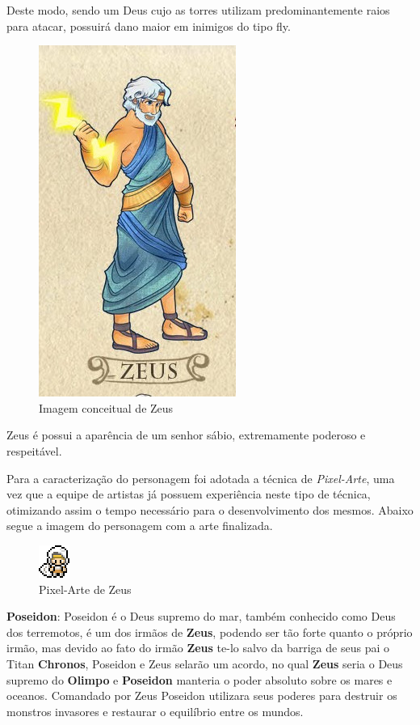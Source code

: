 \documentclass[11pt]{article} %
\begin{document}
Deste modo, sendo um Deus cujo as torres utilizam predominantemente raios para atacar, possuirá dano maior em inimigos do tipo fly.
\begin{figure}[!htp]
\centering
\includegraphics[scale=0.25]{res/characters/zeus.png}
\caption{Imagem conceitual de Zeus}
\label{zeus}
\end{figure}

Zeus é possui a aparência de um senhor sábio, extremamente poderoso e respeitável.

Para a caracterização do personagem foi adotada a técnica de \textit{Pixel-Arte}, uma vez que a equipe de artistas já possuem experiência neste tipo de técnica, otimizando  assim o tempo necessário para o desenvolvimento dos mesmos. Abaixo segue a imagem do personagem com a arte finalizada.

\begin{figure}[!htp]
\centering
\includegraphics[scale=2]{res/characters/zeus_panel.png}
\caption{Pixel-Arte de Zeus}
\label{zeus}
\end{figure}

\newpage

{\large \textbf{Poseidon}}: Poseidon é o Deus supremo do mar, também conhecido como Deus dos terremotos, é um dos irmãos de \textbf{Zeus}, podendo ser tão forte quanto o próprio irmão, mas devido ao fato do irmão \textbf{Zeus} te-lo salvo da barriga de seus pai o Titan \textbf{Chronos}, Poseidon e Zeus selarão um acordo, no qual \textbf{Zeus} seria o Deus supremo do \textbf{Olimpo} e \textbf{Poseidon} manteria o poder absoluto sobre os mares e oceanos. Comandado por Zeus Poseidon utilizara seus poderes para destruir os monstros invasores e restaurar o equilíbrio entre os mundos.
\end{document}
